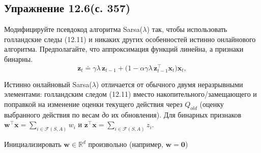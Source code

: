 \subsection{Упражнение 12.6(с. 357)}
Модифицируйте псевдокод алгоритма Sarsa($\lambda$) так, чтобы использовать
голландские следы (12.11) и никаких других особенностей истинно онлайнового
алгоритма. Предполагайте, что аппроксимация функций линейна, а признаки бинарны.
\begin{equation}
    \mathbf z_t \doteq \gamma\lambda\,\mathbf z_{t-1}
    + \big(1 - \alpha\gamma\lambda\,\mathbf z_{t-1}^\top \mathbf x_t\big)\mathbf x_t,
    \tag{12.11}
\end{equation}
\begin{solution}
    Истинно онлайновый Sarsa($\lambda$) отличается от обычного двумя неразрывными
    элементами: голландским следом (12.11) вместо накопительного/замещающего и
    поправкой на изменение оценки текущего действия через $Q_{old}$ (оценку
    выбранного действия по весам \emph{до} их обновления). Для бинарных признаков
    $\mathbf w^\top\mathbf x = \sum_{i\in\mathcal F(S,A)} w_i$ и $\mathbf z^\top\mathbf x
    = \sum_{i\in\mathcal F(S,A)} z_i$.

    \begin{algorithm}[H]
        \DontPrintSemicolon
        Инициализировать $\mathbf w\in\mathbb R^d$ произвольно (например, $\mathbf w=\mathbf 0$)\;
    \end{algorithm}


\end{solution}
